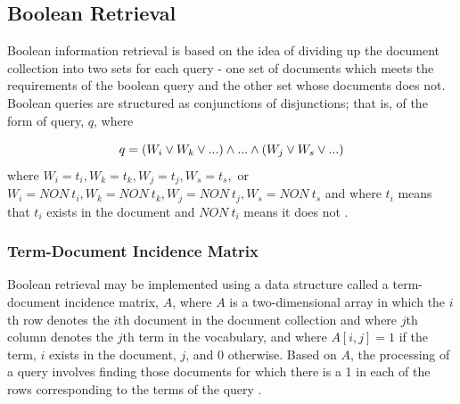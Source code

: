\subsection{Boolean Retrieval}

Boolean information retrieval is based on the idea of dividing up the document collection into two sets for each query - one set of documents which meets the requirements of the boolean query and the other set whose documents does not.  Boolean queries are structured as conjunctions of disjunctions; that is, of the form of query, $q$, where


\begin{equation}
q = (W_i \lor W_k \lor ...) \land ... \land (W_j \lor W_s \lor ...) \\
\end{equation}
where $W_i = t_i, W_k = t_k, W_j = t_j, W_s = t_s,$ or $W_i = NON\ t_i, W_k = NON\ t_k, W_j = NON\ t_j, W_s = NON\ t_s$ and where $t_i$ means that $t_i$ exists in the document and $NON\ t_i$ means it does not \cite{wiki:boolean_retrieval}.

%
%

\subsubsection{Term-Document Incidence Matrix}

Boolean retrieval may be  implemented using a data structure called a term-document incidence matrix, $A$, where $A$ is a two-dimensional array in which the $i$th row denotes the $i$th document in the document collection and where $j$th column denotes the $j$th term in the vocabulary, and where $A[i,j] = 1$ if the term, $i$ exists in the document, $j$, and 0 otherwise.  Based on $A$, the processing of a query involves finding those documents for which there is a 1 in each of the rows corresponding to the terms of the query \cite{manning_2008_introduction_ch1}.  


